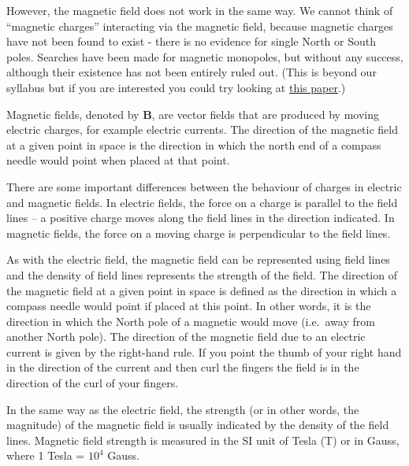 \documentclass[
  letterpaper,
  DIV=11,
  numbers=noendperiod]{scrreprt}
\begin{document}
However, the magnetic field does not work in the same way. We cannot
think of ``magnetic charges'' interacting via the magnetic field,
because magnetic charges have not been found to exist - there is no
evidence for single North or South poles. Searches have been made for
magnetic monopoles, but without any success, although their existence
has not been entirely ruled out. (This is beyond our syllabus but if you
are interested you could try looking at
\href{https://royalsocietypublishing.org/doi/10.1098/rsta.2018.0328}{this
paper}.)

Magnetic fields, denoted by \(\mathrm{\mathbf{B}}\), are vector fields
that are produced by moving electric charges, for example electric
currents. The direction of the magnetic field at a given point in space
is the direction in which the north end of a compass needle would point
when placed at that point.

There are some important differences between the behaviour of charges in
electric and magnetic fields. In electric fields, the force on a charge
is parallel to the field lines -- a positive charge moves along the
field lines in the direction indicated. In magnetic fields, the force on
a moving charge is perpendicular to the field lines.

As with the electric field, the magnetic field can be represented using
field lines and the density of field lines represents the strength of
the field. The direction of the magnetic field at a given point in space
is defined as the direction in which a compass needle would point if
placed at this point. In other words, it is the direction in which the
North pole of a magnetic would move (i.e.~away from another North pole).
The direction of the magnetic field due to an electric current is given
by the right-hand rule. If you point the thumb of your right hand in the
direction of the current and then curl the fingers the field is in the
direction of the curl of your fingers.

In the same way as the electric field, the strength (or in other words,
the magnitude) of the magnetic field is usually indicated by the density
of the field lines. Magnetic field strength is measured in the SI unit
of Tesla (T) or in Gauss, where 1 Tesla = \(10^4\) Gauss.
\end{document}
